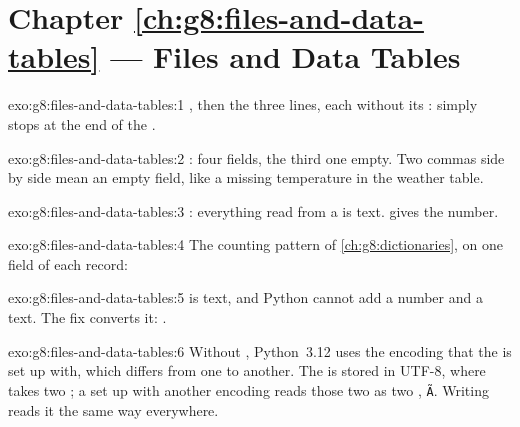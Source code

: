 \section*{Chapter \ref{ch:g8:files-and-data-tables} --- Files and Data Tables}

\begin{solution}{exo:g8:files-and-data-tables:1}
, then the three lines, each without its :
 simply stops at the end of the .
\end{solution}

\begin{solution}{exo:g8:files-and-data-tables:2}
\code{['a', 'b', '', 'c']}: four fields, the third one empty. Two commas side
by side mean an empty field, like a missing temperature in the weather table.
\end{solution}

\begin{solution}{exo:g8:files-and-data-tables:3}
: everything read from a  is text. 
gives the number.
\end{solution}

\begin{solution}{exo:g8:files-and-data-tables:4}
The counting pattern of \cref{ch:g8:dictionaries}, on one field of each
record:

\label{lst:g8:files-and-data-tables:sol-genres}
\end{solution}

\begin{solution}{exo:g8:files-and-data-tables:5}
 is text, and Python cannot add a number and a text. The
fix converts it: .
\end{solution}

\begin{solution}{exo:g8:files-and-data-tables:6}
Without , Python~3.12 uses the encoding that the  is
set up with, which differs from one  to another. The  is stored
in UTF-8, where  takes two ; a  set up with another
encoding reads those two  as two , \texttt{\~{A}\textcopyright}. Writing
 reads it the same way everywhere.
\end{solution}

